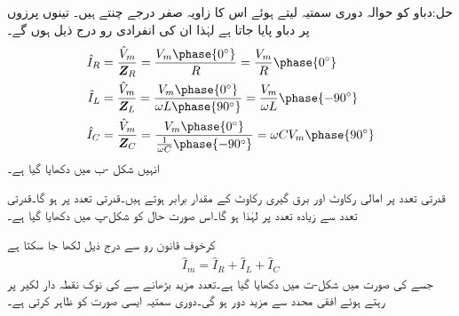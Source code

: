 حل:دباو  کو حوالہ دوری سمتیہ لیتے ہوئے اس کا زاویہ صفر درجے چنتے ہیں۔ تینوں پرزوں پر   دباو پایا جاتا ہے لہٰذا ان کی انفرادی رو درج ذیل ہوں گے۔
\begin{align*}
\hat{I}_R&=\frac{\hat{V}_m}{\bZ_R}=\frac{V_m\phase{0^{\circ}}}{R}=\frac{V_m}{R}\phase{0^{\circ}}\\
\hat{I}_L&=\frac{\hat{V}_m}{\bZ_L}=\frac{V_m\phase{0^{\circ}}}{\omega L \phase{90^{\circ}}}=\frac{V_m}{\omega L} \phase{-90^{\circ}}\\
\hat{I}_C&=\frac{\hat{V}_m}{\bZ_C}=\frac{V_m \phase{0^{\circ}}}{\frac{1}{\omega C} \phase{-90^{\circ}}}=\omega C V_m \phase{90^{\circ}}
\end{align*}
انہیں شکل -ب میں دکھایا گیا ہے۔

قدرتی تعدد  پر امالی رکاوٹ اور برق گیری رکاوٹ کے  مقدار برابر  ہوتے ہیں۔قدرتی تعدد پر  ہو گا۔قدرتی تعدد سے زیادہ تعدد پر  لہٰذا  ہو گا۔اس صورت حال کو شکل-پ میں دکھایا گیا ہے۔

کرخوف قانون رو سے درج ذیل لکھا جا سکتا ہے
\begin{align*}
\hat{I}_m=\hat{I}_R+\hat{I}_L+\hat{I}_C
\end{align*}
جسے   کی صورت میں  شکل-ت میں دکھایا گیا ہے۔تعدد مزید بڑھانے سے  کی نوک نقطہ دار لکیر پر رہتے ہوئے افقی محدد سے مزید دور ہو گی۔دوری سمتیہ  ایسی صورت کو ظاہر کرتی ہے۔

